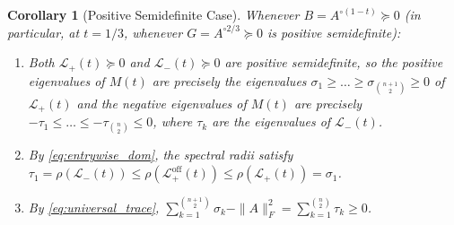 \documentclass[11pt,a4paper]{article}
\theoremstyle{plain}
\newtheorem{corollary}[theorem]{Corollary}
\theoremstyle{definition}
\theoremstyle{remark}
\begin{document}
\begin{corollary}[Positive Semidefinite Case]\label{cor:psd}
Whenever $B = A^{\circ(1-t)} \succeq 0$ (in particular, at $t = 1/3$, whenever $G = A^{\circ 2/3} \succeq 0$ is positive semidefinite):
\begin{enumerate}[label=(\roman*),nosep]
  \item Both $\mathcal{L}_+(t) \succeq 0$ and $\mathcal{L}_-(t) \succeq 0$ are positive semidefinite, so the positive eigenvalues of $M(t)$ are precisely the eigenvalues $\sigma_1 \ge \dots \ge \sigma_{\binom{n+1}{2}} \ge 0$ of $\mathcal{L}_+(t)$ and the negative eigenvalues of $M(t)$ are precisely $-\tau_1 \le \dots \le -\tau_{\binom{n}{2}} \le 0$, where $\tau_k$ are the eigenvalues of $\mathcal{L}_-(t)$.
  \item By \eqref{eq:entrywise_dom}, the spectral radii satisfy $\tau_1 = \rho(\mathcal{L}_-(t)) \le \rho(\mathcal{L}_+^{\mathrm{off}}(t)) \le \rho(\mathcal{L}_+(t)) = \sigma_1$.
  \item By \eqref{eq:universal_trace}, $\sum_{k=1}^{\binom{n+1}{2}} \sigma_k - \|A\|_F^2 = \sum_{k=1}^{\binom{n}{2}} \tau_k \ge 0$.
\end{enumerate}
\end{corollary}
\end{document}
